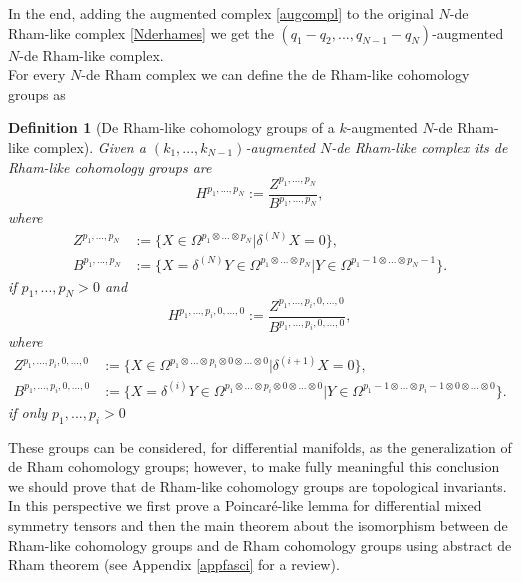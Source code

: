 \documentclass[a4paper,12pt]{article}
\newtheorem{Definition}{Definition}[section]
\begin{document}
In the end, adding the augmented complex \eqref{augcompl} to the original $N$-de Rham-like complex \eqref{Nderhames} we get the $(q_1-q_2,...,q_{N-1}-q_N)$-augmented $N$-de Rham-like complex. 
\\

For every $N$-de Rham complex we can define the de Rham-like cohomology groups as
\begin{Definition}[De Rham-like cohomology groups of a $k$-augmented $N$-de Rham-like complex]\label{coholike}
    Given a $(k_1,...,k_{N-1})$-augmented $N$-de Rham-like complex its de Rham-like cohomology groups are
    \begin{equation}
    H^{p_1,...,p_N}:=\frac{Z^{p_1,...,p_N}}{B^{p_1,...,p_N}},
    \end{equation}
    where 
    \begin{equation}
    \begin{aligned}
        Z^{p_1,...,p_N}&:=\{X \in \Omega^{p_1 \otimes ...\otimes p_N} | \delta^{(N)}X=0\},\\
        B^{p_1,...,p_N}&:=\{X=\delta^{(N)}Y \in \Omega^{p_1\otimes ...\otimes p_N} | Y \in \Omega^{p_1-1\otimes ...\otimes p_N-1}\}.
        \end{aligned}    
    \end{equation}
if $p_1,...,p_N >0$ and 
\begin{equation}
    H^{p_1,...,p_i,0,...,0}:=\frac{Z^{p_1,...,p_i,0,...,0}}{B^{p_1,...,p_i,0,...,0}},
\end{equation}
 where 
    \begin{equation}
    \begin{aligned}
        Z^{p_1,...,p_i,0,...,0}&:=\{X \in \Omega^{p_1 \otimes ...\otimes p_i\otimes 0 \otimes ... \otimes 0} | \delta^{(i+1)}X=0\},\\
        B^{p_1,...,p_i,0,...,0}&:=\{X=\delta^{(i)}Y \in \Omega^{p_1 \otimes ...\otimes p_i\otimes 0 \otimes ... \otimes 0} | Y \in \Omega^{p_1-1 \otimes ...\otimes p_i-1\otimes 0 \otimes ... \otimes 0}\}.
        \end{aligned}    
    \end{equation}
if only $p_1,...,p_i >0$     
\end{Definition}
These groups can be considered, for differential manifolds, as the generalization of de Rham cohomology groups; however, to make fully meaningful this conclusion we should prove that de Rham-like cohomology groups are topological invariants. In this perspective we first prove a Poincaré-like lemma for differential mixed symmetry tensors and then the main theorem about the isomorphism between de Rham-like cohomology groups and de Rham cohomology groups using abstract de Rham theorem  (see Appendix \ref{appfasci} for a review). 
\end{document}
